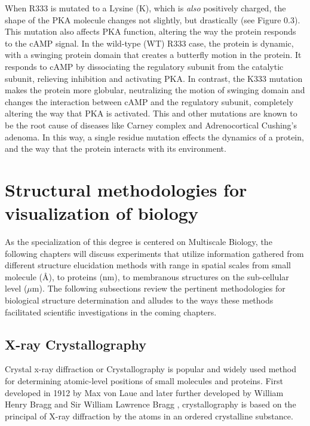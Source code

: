 \documentclass[12pt]{ucsddissertation}
\begin{document}
\begin{dissertationintroduction}
 When R333  is mutated to a Lysine (K), which is \textit{also} positively charged, the shape of the PKA molecule changes not slightly, but drastically (see Figure 0.3). This mutation also affects PKA function, altering the way the protein responds to the cAMP signal. In the wild-type (WT) R333 case, the protein is dynamic, with a swinging protein domain that creates a butterfly motion in the protein. It responds to cAMP by dissociating the regulatory subunit from the catalytic subunit, relieving inhibition and activating PKA. In contrast, the K333 mutation makes the protein more globular, neutralizing the motion of swinging domain\cite{Cheng2009} and changes the interaction between cAMP and the regulatory subunit, completely altering the way that PKA is activated. This and other mutations are known to be the root cause of diseases like Carney complex\cite{Kirschner2000} and Adrenocortical Cushing’s adenoma\cite{Calebiro2014}. In this way, a single residue mutation effects the dynamics of a protein, and the way that the protein interacts with its environment. 


\section{Structural methodologies for visualization of biology}

As the specialization of this degree is centered on Multiscale Biology, the following chapters will discuss experiments that utilize information gathered from different structure elucidation methods with range in spatial scales from small molecule (\si{\angstrom}), to proteins (nm), to membranous structures on the sub-cellular level ($\mu$m). The following subsections review the pertinent methodologies for biological structure determination and alludes to the ways these methods facilitated scientific investigations in the coming chapters. 

\subsection{X-ray Crystallography}
Crystal x-ray diffraction or Crystallography is popular and widely used method for determining atomic-level positions of small molecules and proteins. First developed in 1912 by Max von Laue and later further developed by William Henry Bragg and Sir William Lawrence Bragg \cite{Bragg2014}, crystallography is based on the principal of X-ray diffraction by the atoms in an ordered crystalline substance. 


\end{dissertationintroduction}
\end{document}
